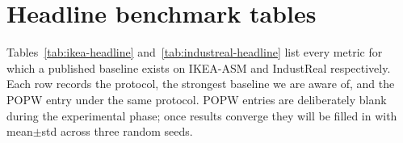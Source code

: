 \documentclass[11pt,a4paper]{article}
\newcommand{\popw}{POPW}
\newcommand{\ikea}{IKEA-ASM}
\newcommand{\industreal}{IndustReal}
\begin{document}
\FloatBarrier
\section{Headline benchmark tables}
\label{sec:headline}

Tables~\ref{tab:ikea-headline} and~\ref{tab:industreal-headline} list every
metric for which a published baseline exists on \ikea{} and \industreal{}
respectively. Each row records the protocol, the strongest baseline we are
aware of, and the \popw{} entry under the same protocol. \popw{} entries are
deliberately blank during the experimental phase; once results converge they
will be filled in with mean$\pm$std across three random seeds.

\end{document}
